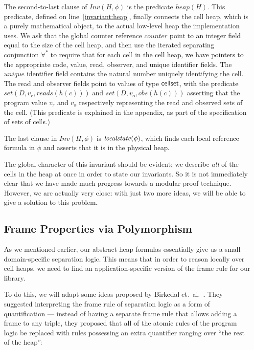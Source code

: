 \documentclass[preprint,natbib]{sigplanconf}
\begin{document}
The second-to-last clause of $Inv(H, \phi)$ is the predicate $heap(H)$. This
predicate, defined on line~\ref{invariant:heap}, finally connects the
cell heap, which is a purely mathematical object, to the actual
low-level heap the implementation uses. We ask that the global counter
reference $counter$ point to an integer field equal to the size of the
cell heap, and then use the iterated separating conjunction
$\forall^*$ to require that for each cell in the cell heap, we have
pointers to the appropriate code, value, read, observer, and unique
identifier fields. The $unique$ identifier field contains the natural
number uniquely identifying the cell. The read and observer fields
point to values of type $\mbox{\textsf{{cellset}}}$, with the predicate $set(D, v_r,
reads(h(c)))$ and $set(D, v_o, obs(h(c)))$ asserting that the program
value $v_r$ and $v_o$ respectively representing the read and observed
sets of the cell. (This predicate is explained in the appendix, as part
of the specification of sets of cells.)

The last clause in $Inv(H,\phi)$ is $\mathit{localstate}(\phi)$, which 
finds each local reference formula in $\phi$ and asserts that it is in
the physical heap.

The global character of this invariant should be evident; we describe
\emph{all} of the cells in the heap at once in order to state our
invariants. So it is not immediately clear that we have made much
progress towards a modular proof technique. However, we are actually
very close: with just two more ideas, we will be able to give a
solution to this problem.

\subsection{Frame Properties via Polymorphism}

As we mentioned earlier, our abstract heap formulas essentially give
us a small domain-specific separation logic. This means that in order
to reason locally over cell heaps, we need to find an
application-specific version of the frame rule for our library. 

To do this, we will adapt some ideas proposed by
Birkedal et.\ al.~\cite{birkedal-torpsmith-yang-lics05}.
They suggested interpreting the frame rule of separation logic as a form of
quantification --- instead of having a separate frame rule that allows
adding a frame to any triple, they proposed that all of the atomic
rules of the program logic be replaced with rules possessing an extra
quantifier ranging over ``the rest of the heap'':
\end{document}
